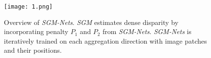 \documentclass[twocolumn]{article}
\begin{document}
	\begin{figure}[ht]
		\centering
		\texttt{[image: 1.png]}
		\caption{Overview of \emph{SGM-Nets}. \emph{SGM} estimates dense disparity by incorporating penalty $P_1$ and $P_2$ from \emph{SGM-Nets}. \emph{SGM-Nets} is iteratively trained on each aggregation direction with image patches and their positions.}\label{SGM-Nets}
	\end{figure}



	
\end{document}
